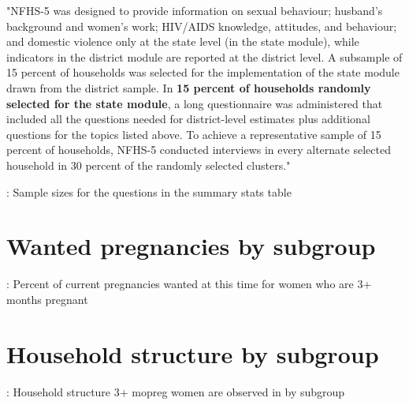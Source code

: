 \documentclass{article}
\begin{document}
"NFHS-5 was designed to provide information on sexual behaviour; husband’s background and women’s work;
HIV/AIDS knowledge, attitudes, and behaviour; and domestic violence only at the state level (in the state module), while indicators in the district module are reported at the district level. A subsample of 15 percent of households was
selected for the implementation of the state module drawn from the district sample. In \textbf{15 percent of households randomly selected for the state module}, a long questionnaire was administered that included all the questions needed for district-level estimates plus additional questions for the topics listed above. To achieve a representative sample of 15 percent of households, NFHS-5 conducted interviews in every alternate selected household in 30 percent of the
randomly selected clusters."

\begin{table}[H]
    \centering
    \setlength{\tabcolsep}{4pt} %
    \footnotesize %
    \caption{: Sample sizes for the questions in the summary stats table}
    \label{tab:sumstat}
    \begin{adjustbox}{width=\textwidth}
        
    \end{adjustbox}
\end{table}

\section{Wanted pregnancies by subgroup}

\begin{table}[H]
    \centering
    \setlength{\tabcolsep}{4pt} %
    \footnotesize %
    \caption{: Percent of current pregnancies wanted at this time for women who are 3+ months pregnant}
    \label{tab:sumstat}
    \begin{adjustbox}{width=\textwidth}
        
    \end{adjustbox}
\end{table}

\section{Household structure by subgroup}

\begin{table}[H]
    \centering
    \setlength{\tabcolsep}{4pt} %
    \footnotesize %
    \caption{: Household structure 3+ mopreg women are observed in by subgroup}
    \label{tab:sumstat}
    \begin{adjustbox}{width=\textwidth}
        
    \end{adjustbox}
\end{table}
\end{document}
